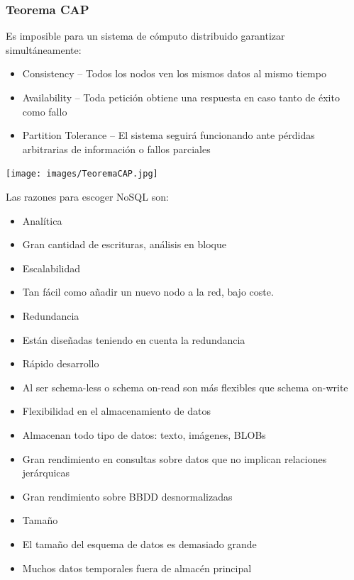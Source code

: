 \documentclass[]{book}
\providecommand{\tightlist}{%
  \setlength{\itemsep}{0pt}\setlength{\parskip}{0pt}}
\begin{document}
\hypertarget{teorema-cap}{%
\subsubsection{Teorema CAP}\label{teorema-cap}}

Es imposible para un sistema de cómputo distribuido garantizar simultáneamente:

\begin{itemize}
\tightlist
\item
  Consistency -- Todos los nodos ven los mismos datos al mismo tiempo
\item
  Availability -- Toda petición obtiene una respuesta en caso tanto de éxito como fallo
\item
  Partition Tolerance -- El sistema seguirá funcionando ante pérdidas arbitrarias de información o fallos parciales
\end{itemize}

\texttt{[image: images/TeoremaCAP.jpg]}

Las razones para escoger NoSQL son:

\begin{itemize}
\tightlist
\item
  Analítica
\item
  Gran cantidad de escrituras, análisis en bloque
\item
  Escalabilidad
\item
  Tan fácil como añadir un nuevo nodo a la red, bajo coste.
\item
  Redundancia
\item
  Están diseñadas teniendo en cuenta la redundancia
\item
  Rápido desarrollo
\item
  Al ser schema-less o schema on-read son más flexibles que schema on-write
\item
  Flexibilidad en el almacenamiento de datos
\item
  Almacenan todo tipo de datos: texto, imágenes, BLOBs
\item
  Gran rendimiento en consultas sobre datos que no implican relaciones jerárquicas
\item
  Gran rendimiento sobre BBDD desnormalizadas
\item
  Tamaño
\item
  El tamaño del esquema de datos es demasiado grande
\item
  Muchos datos temporales fuera de almacén principal
\end{itemize}
\end{document}
